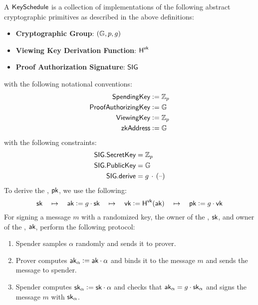 \begin{definition}
    A ${\textsf{KeySchedule}}$ is a collection of implementations of the following abstract cryptographic primitives as described in the above definitions:
    \begin{itemize}
        \item \textbf{Cryptographic Group}: $({\mathbb{G}}, p, g)$
        \item \textbf{Viewing Key Derivation Function}: ${\textsf{H}}^{\textsf{vk}}$
        \item \textbf{Proof Authorization Signature}: ${\textsf{SIG}}$
    \end{itemize}
    with the following notational conventions:
    \begin{align*}
        {\textsf{SpendingKey}}         &:= {\mathbb{Z}}_p \\
        {\textsf{ProofAuthorizingKey}} &:= {\mathbb{G}} \\
        {\textsf{ViewingKey}}          &:= {\mathbb{Z}}_p \\
        {\textsf{zkAddress}}           &:= {\mathbb{G}}
    \end{align*}
    with the following constraints:
    \begin{align*}
        {\textsf{SIG}}.{\textsf{SecretKey}} &= {\mathbb{Z}}_p \\
        {\textsf{SIG}}.{\textsf{PublicKey}} &= {\mathbb{G}} \\
        {\textsf{SIG}}.{\textsf{derive}}    &= g\,\cdot\,({\textrm{--}})
    \end{align*}
    To derive the \zkAddress{}, ${\textsf{pk}}$, we use the following:
    \[{\textsf{sk}} \quad\mapsto\quad {\textsf{ak}} := g \cdot {\textsf{sk}} \quad\mapsto\quad {\textsf{vk}} := {\textsf{H}}^{\textsf{vk}}({\textsf{ak}}) \quad\mapsto\quad {\textsf{pk}} := g \cdot {\textsf{vk}}\]
    For signing a message $m$ with a randomized key, the owner of the \SpendingKey{}, ${\textsf{sk}}$, and owner of the \ProofAuthorizingKey{}, ${\textsf{ak}}$, perform the following protocol:
    \begin{enumerate}
        \item Spender samples $\alpha$ randomly and sends it to prover.
        \item Prover computes ${\textsf{ak}}_\alpha := {\textsf{ak}} \cdot \alpha$ and binds it to the message $m$ and sends the message to spender.
        \item Spender computes ${\textsf{sk}}_\alpha := {\textsf{sk}} \cdot \alpha$ and checks that ${\textsf{ak}}_\alpha = g \cdot {\textsf{sk}}_\alpha$ and signs the message $m$ with ${\textsf{sk}}_\alpha$.
    \end{enumerate}
\end{definition}


